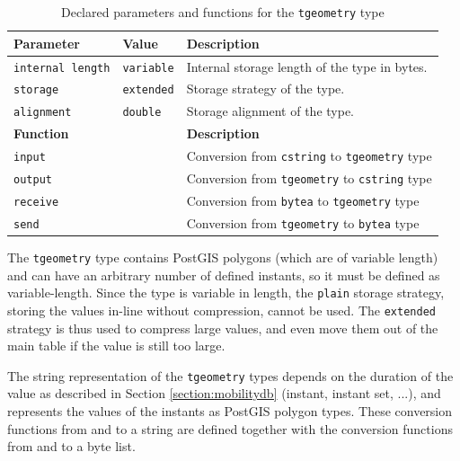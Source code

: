 \begin{table}[htb]
    \centering
    \begin{tabularx}{\textwidth}{|l|l|X|}
    \hline
    \textbf{Parameter}  & \textbf{Value}        & \textbf{Description} \\ 
    \hline
    \lstinline+internal length+     & \lstinline+variable+              & Internal storage length of the type in bytes. \\
    \hline
    \lstinline+storage+             & \lstinline+extended+              & Storage strategy of the type. \\
    \hline
    \lstinline+alignment+           & \lstinline+double+                & Storage alignment of the type. \\
    \hline
    \multicolumn{2}{|l|}{\textbf{Function}}     & \textbf{Description} \\ 
    \hline
    \multicolumn{2}{|l|}{\lstinline+input+}     & Conversion from \lstinline{cstring} to \lstinline{tgeometry} type \\
    \hline
    \multicolumn{2}{|l|}{\lstinline+output+}    & Conversion from \lstinline{tgeometry} to \lstinline{cstring} type \\
    \hline
    \multicolumn{2}{|l|}{\lstinline+receive+}   & Conversion from \lstinline{bytea} to \lstinline{tgeometry} type \\
    \hline
    \multicolumn{2}{|l|}{\lstinline+send+}      & Conversion from \lstinline{tgeometry} to \lstinline{bytea} type \\
    \hline
    \end{tabularx}
    \caption{Declared parameters and functions for the \lstinline{tgeometry} type}
    \label{table:tgeometry_type_declaration}
\end{table}

The \lstinline+tgeometry+ type contains PostGIS polygons (which are of variable length) and can have an arbitrary number of defined instants, so it must be defined as variable-length. Since the type is variable in length, the \lstinline{plain} storage strategy, storing the values in-line without compression, cannot be used. The \lstinline{extended} strategy is thus used to compress large values, and even move them out of the main table if the value is still too large.

The string representation of the \lstinline+tgeometry+ types depends on the duration of the value as described in Section \ref{section:mobilitydb} (instant, instant set, ...), and represents the values of the instants as PostGIS polygon types. These conversion functions from and to a string are defined together with the conversion functions from and to a byte list.

